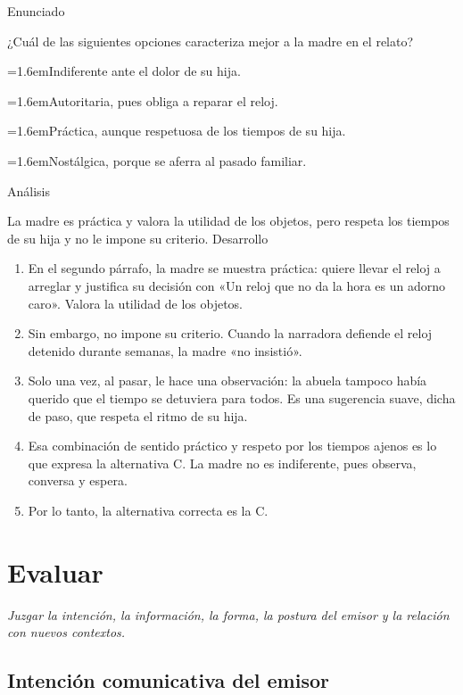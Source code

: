 \documentclass[10pt,a4paper,twocolumn]{article}
\newcommand{\alternativa}[2]{\par\noindent\hangindent=1.6em\hangafter=1\makebox[1.6em][l]{\tecla{#1}}#2\par}
\newcommand{\clave}[1]{\par\smallskip{\sffamily\footnotesize\color{esmeralda} Clave \teclaok{#1}}\par}
\begin{document}
\begin{ejemplo}
{\sffamily\footnotesize\color{zinc500} Enunciado}\par
¿Cuál de las siguientes opciones caracteriza mejor a la madre en el relato?
\alternativa{A}{Indiferente ante el dolor de su hija.}
\alternativa{B}{Autoritaria, pues obliga a reparar el reloj.}
\alternativa{C}{Práctica, aunque respetuosa de los tiempos de su hija.}
\alternativa{D}{Nostálgica, porque se aferra al pasado familiar.}
\clave{C}
{\sffamily\footnotesize\color{zinc500} Análisis}\par La madre es práctica y valora la utilidad de los objetos, pero respeta los tiempos de su hija y no le impone su criterio.
{\sffamily\footnotesize\color{zinc500} Desarrollo}
\begin{enumerate}
  \item En el segundo párrafo, la madre se muestra práctica: quiere llevar el reloj a arreglar y justifica su decisión con «Un reloj que no da la hora es un adorno caro». Valora la utilidad de los objetos.
  \item Sin embargo, no impone su criterio. Cuando la narradora defiende el reloj detenido durante semanas, la madre «no insistió».
  \item Solo una vez, al pasar, le hace una observación: la abuela tampoco había querido que el tiempo se detuviera para todos. Es una sugerencia suave, dicha de paso, que respeta el ritmo de su hija.
  \item Esa combinación de sentido práctico y respeto por los tiempos ajenos es lo que expresa la alternativa C. La madre no es indiferente, pues observa, conversa y espera.
  \item Por lo tanto, la alternativa correcta es la C.
\end{enumerate}
\end{ejemplo}

\section{Evaluar}

{\itshape\color{zinc700} Juzgar la intención, la información, la forma, la postura del emisor y la relación con nuevos contextos.}

\subsection{Intención comunicativa del emisor}
\end{document}
